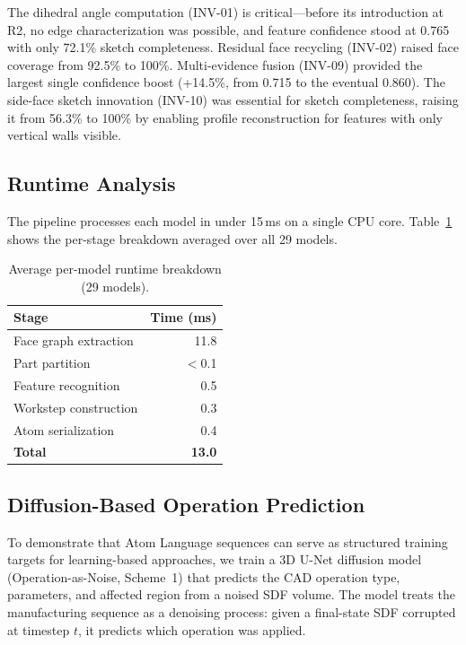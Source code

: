 \documentclass{styles/svproc}
\begin{document}
The dihedral angle computation (INV-01) is critical---before its introduction at R2, no edge characterization was possible, and feature confidence stood at 0.765 with only 72.1\% sketch completeness. Residual face recycling (INV-02) raised face coverage from 92.5\% to 100\%. Multi-evidence fusion (INV-09) provided the largest single confidence boost (+14.5\%, from 0.715 to the eventual 0.860). The side-face sketch innovation (INV-10) was essential for sketch completeness, raising it from 56.3\% to 100\% by enabling profile reconstruction for features with only vertical walls visible.

\subsection{Runtime Analysis}

The pipeline processes each model in under 15\,ms on a single CPU core. Table~\ref{tab:timing} shows the per-stage breakdown averaged over all 29 models.

\begin{table}[t]
\caption{Average per-model runtime breakdown (29 models).}
\label{tab:timing}
\centering
\begin{tabular}{lr}
\toprule
Stage & Time (ms) \\
\midrule
Face graph extraction & 11.8 \\
Part partition & $<$0.1 \\
Feature recognition & 0.5 \\
Workstep construction & 0.3 \\
Atom serialization & 0.4 \\
\midrule
\textbf{Total} & \textbf{13.0} \\
\bottomrule
\end{tabular}
\end{table}

\subsection{Diffusion-Based Operation Prediction}

To demonstrate that Atom Language sequences can serve as structured training targets for learning-based approaches, we train a 3D U-Net diffusion model (Operation-as-Noise, Scheme~1) that predicts the CAD operation type, parameters, and affected region from a noised SDF volume. The model treats the manufacturing sequence as a denoising process: given a final-state SDF corrupted at timestep $t$, it predicts which operation was applied.
\end{document}

